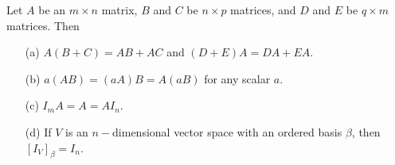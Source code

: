 \begin{theorem}\label{prop of matrices} %
    Let \( A  \) be an \( m \times n  \) matrix, \( B  \) and \(  C  \) be \( n \times p  \) matrices, and \( D  \) and \( E  \) be \( q \times  m  \) matrices. Then
    \begin{enumerate}
        \item[(a)] \( A(B+C) = AB + AC  \) and \( (D+E) A = DA + EA  \).
        \item[(b)] \( a(AB) = (aA)B  = A(aB)\) for any scalar \( a  \).
        \item[(c)] \( {I}_{m} A = A = A {I}_{n} \).
        \item[(d)] If \( V  \) is an \( n- \)dimensional vector space with an ordered basis \( \beta  \), then \( [{I}_{V}]_{\beta}^{}  = {I}_{n} \).
    \end{enumerate}
\end{theorem}
